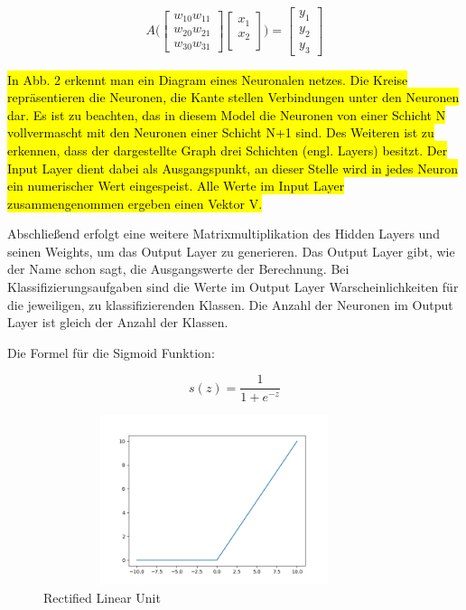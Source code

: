 \begin{align}

    
          A\Bigg(
         \begin{bmatrix}
           w_{10}  w_{11} \\     
           w_{20}  w_{21} \\           
           w_{30} w_{31}
          \end{bmatrix}
          \begin{bmatrix}
           x_{1} \\
           x_{2} \\
         \end{bmatrix}
            \Bigg)
          =
          \begin{bmatrix}
           y_{1} \\
           y_{2} \\
     
           y_{3}
         \end{bmatrix}
         
 	
          
 \end{align}

\hl{ In Abb. 2 erkennt man ein Diagram eines Neuronalen netzes. Die Kreise repräsentieren die Neuronen, die Kante stellen Verbindungen unter den Neuronen dar. Es ist zu beachten, das in diesem Model die Neuronen von einer Schicht N vollvermascht mit den Neuronen einer Schicht N+1 sind. Des Weiteren ist zu erkennen, dass der dargestellte Graph drei Schichten (engl. Layers) besitzt. Der Input Layer dient dabei als Ausgangspunkt, an dieser Stelle wird in jedes Neuron ein numerischer Wert eingespeist. Alle Werte im Input Layer zusammengenommen ergeben einen Vektor V.}

Abschließend erfolgt eine weitere Matrixmultiplikation des Hidden Layers und seinen Weights, um das Output Layer zu generieren. Das Output Layer gibt, wie der Name schon sagt, die Ausgangswerte der Berechnung. Bei Klassifizierungsaufgaben sind die Werte im Output Layer Warscheinlichkeiten für die jeweiligen, zu klassifizierenden Klassen. Die Anzahl der Neuronen im Output Layer ist gleich der Anzahl der Klassen.

Die Formel für die Sigmoid Funktion: 

\begin{equation}
\label{Sigmoid}
s(z) = \frac{1}{1+e^{-z}}
\end{equation}

\begin{figure}
    \centering
    \includegraphics[height= 5cm, width = 10cm]{Pictures/Relu.png}
    \caption{Rectified Linear Unit}
\end{figure}


